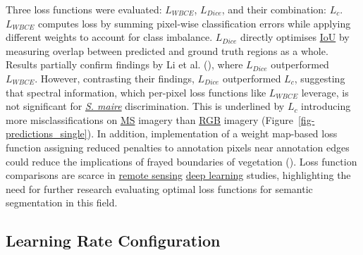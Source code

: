 \documentclass[
]{scrreprt}
\begin{document}
Three loss functions were evaluated:
\hyperref[acronyms_WBCE]{\(L_{WBCE}\)},
\hyperref[acronyms_DICE]{\(L_{Dice}\)}, and their combination:
\hyperref[acronyms_WBCE_D]{\(L_{c}\)}.
\hyperref[acronyms_WBCE]{\(L_{WBCE}\)} computes loss by summing
pixel-wise classification errors while applying different weights to
account for class imbalance. \hyperref[acronyms_DICE]{\(L_{Dice}\)}
directly optimises \hyperref[acronyms_IoU]{IoU} by measuring overlap
between predicted and ground truth regions as a whole. Results partially
confirm findings by Li et al.
(), where
\hyperref[acronyms_DICE]{\(L_{Dice}\)} outperformed
\hyperref[acronyms_WBCE]{\(L_{WBCE}\)}. However, contrasting their
findings, \hyperref[acronyms_DICE]{\(L_{Dice}\)} outperformed
\hyperref[acronyms_WBCE_D]{\(L_{c}\)}, suggesting that spectral
information, which per-pixel loss functions like
\hyperref[acronyms_WBCE]{\(L_{WBCE}\)} leverage, is not significant for
\hyperref[acronyms_SM]{\emph{S. maire}} discrimination. This is
underlined by \hyperref[acronyms_WBCE_D]{\(L_{c}\)} introducing more
misclassifications on \hyperref[acronyms_MS]{MS} imagery than
\hyperref[acronyms_RGB]{RGB} imagery
(Figure~\ref{fig-predictions_single}). In addition, implementation of a
weight map-based loss function assigning reduced penalties to annotation
pixels near annotation edges could reduce the implications of frayed
boundaries of vegetation (). Loss function comparisons are scarce in
\hyperref[acronyms_RS]{remote sensing} \hyperref[acronyms_DL]{deep
learning} studies, highlighting the need for further research evaluating
optimal loss functions for semantic segmentation in this field.

\subsection{Learning Rate
Configuration}\label{learning-rate-configuration}
\end{document}
